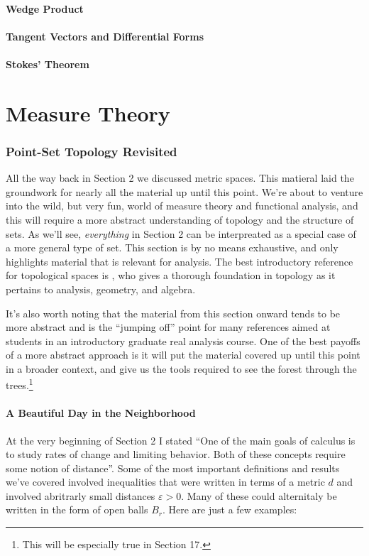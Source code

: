 \documentclass{article}
\theoremstyle{definition}
\begin{document}
	\subsection{Wedge Product}
	\subsection{Tangent Vectors and Differential Forms}
	\subsection{Stokes' Theorem}
	
	\newpage
	\part{Measure Theory}
	
	\section{Point-Set Topology Revisited}
	All the way back in Section 2 we discussed metric spaces. This matieral laid the groundwork for nearly all the material up until this point. We're about to venture into the wild, but very fun, world of measure theory and functional analysis, and this will require a more abstract understanding of topology and the structure of sets. As we'll see, \textit{everything} in Section 2 can be interpreated as a special case of a more general type of set. This section is by no means exhaustive, and only highlights material that is relevant for analysis. The best introductory reference for topological spaces is \cite{munk2}, who gives a thorough foundation in topology as it pertains to analysis, geometry, and algebra. 
	
	It's also worth noting that the material from this section onward tends to be more abstract and is the ``jumping off'' point for many references aimed at students in an introductory graduate real analysis course. One of the best payoffs of a more abstract approach is it will put the material covered up until this point in a broader context, and give us the tools required to see the forest through the trees.\footnote{This will be especially true in Section 17.}
	\subsection{A Beautiful Day in the Neighborhood}
	
	At the very beginning of Section 2 I stated ``One of the main goals of calculus is to study rates of change and limiting behavior. Both of these concepts require some notion of distance''. Some of the most important definitions and results we've covered involved inequalities that were written in terms of a metric $d$ and involved abritrarly small distances $\varepsilon > 0$. Many of these could alternitaly be written in the form of open balls $B_r$. Here are just a few examples: 
	
\end{document}
